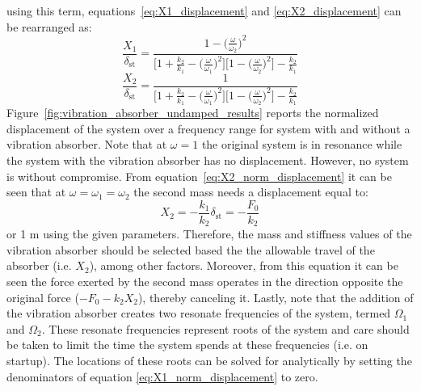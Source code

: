 \documentclass[12pt,letter]{article}
\numberwithin{ex}{section} %
\numberwithin{re}{section} %
\numberwithin{vcs}{section} %
\begin{document}
using this term, equations~\ref{eq:X1_displacement} and \ref{eq:X2_displacement} can be rearranged as:
\begin{equation}
\frac{X_1}{\delta_{\text{st}}} = \frac{1 - \big(\frac{\omega}{\omega_2} \big)^2 }{\Big[1 + \frac{k_2}{k_1} - \big(\frac{\omega}{\omega_1} \big)^2 \Big] \Big[ 1- \big(\frac{\omega}{\omega_2} \big)^2 \Big] -\frac{k_2}{k_1}}
\label{eq:X1_norm_displacement}
\end{equation}
\begin{equation}
\frac{X_2}{\delta_{\text{st}}} = \frac{1}{\Big[1 + \frac{k_2}{k_1} - \big(\frac{\omega}{\omega_1} \big)^2 \Big] \Big[ 1- \big(\frac{\omega}{\omega_2} \big)^2 \Big] -\frac{k_2}{k_1}}
\label{eq:X2_norm_displacement}
\end{equation}
Figure~\ref{fig:vibration_absorber_undamped_results} reports the normalized displacement of the system over a frequency range for system with and without a vibration absorber. Note that at $\omega=1$ the original system is in resonance while the system with the vibration absorber has no displacement. However, no system is without compromise. From equation~\ref{eq:X2_norm_displacement} it can be seen that at $\omega = \omega_1 = \omega_2$ the second mass needs a displacement equal to:
\begin{equation}
X_2 = -\frac{k_1}{k_2}\delta_{\text{st}} = -\frac{F_0}{k_2}
\end{equation}
or 1 m using the given parameters. Therefore, the mass and stiffness values of the vibration absorber should be selected based the the allowable travel of the absorber (i.e. $X_2$), among other factors. Moreover, from this equation it can be seen the force exerted by the second mass operates in the direction opposite the original force ($-F_0 - k_2 X_2$), thereby canceling it. Lastly, note that the addition of the vibration absorber creates two resonate frequencies of the system, termed $\Omega_1$ and $\Omega_2$. These  resonate frequencies represent roots of the system and care should be taken to limit the time the system spends at these frequencies (i.e. on startup). The locations of these roots can be solved for analytically by setting the denominators of equation \ref{eq:X1_norm_displacement} to zero.

\end{document}
